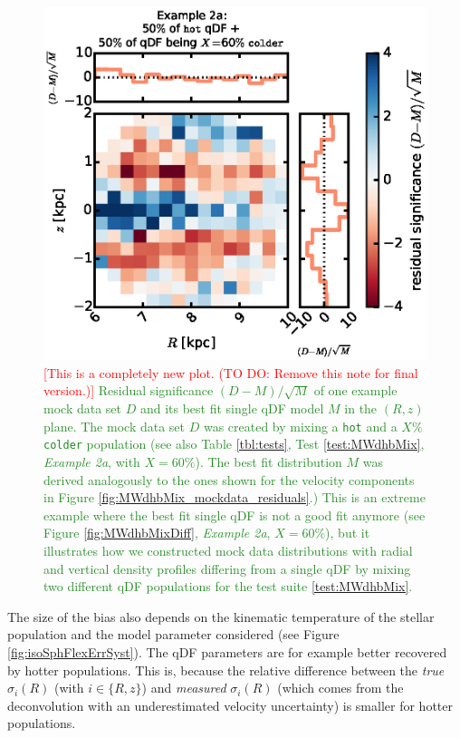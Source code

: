 \documentclass[iop,revtex4,numberedappendix,appendixfloats]{emulateapj}
\newcommand{\NEW}[1]{\textcolor{ForestGreen}{#1}}
\newcommand{\NOTE}[1]{\textcolor{Red}{#1}}
\begin{document}
\begin{figure}[!htbp]
\centering
\includegraphics[width=\columnwidth]{figs/MWbdhMixDiff_hot_2kpc_0.6_a_residual_RvsZ.eps}
\caption{\NOTE{[This is a completely new plot. (TO DO: Remove this note for final version.)]} \NEW{Residual significance $(D-M)/\sqrt{M}$ of one example mock data set $D$ and its best fit single qDF model $M$ in the $(R,z)$ plane. The mock data set $D$ was created by mixing a \texttt{hot} and a $X\%$ \texttt{colder} population (see also Table \ref{tbl:tests}, Test \ref{test:MWdhbMix}, \emph{Example 2a}, with $X=60\%$). The best fit distribution $M$ was derived analogously to the ones shown for the velocity components in Figure \ref{fig:MWdhbMix_mockdata_residuals}.) This is an extreme example where the best fit single qDF is not a good fit anymore (see Figure \ref{fig:MWdhbMixDiff}, \emph{Example 2a}, $X=60\%$), but it illustrates how we constructed mock data distributions with radial and vertical density profiles differing from a single qDF by mixing two different qDF populations for the test suite \ref{test:MWdhbMix}.}}
\label{fig:MWbdhMix_residual_RvsZ}
\end{figure}

The size of the bias also depends on the kinematic temperature of the stellar population and the model parameter considered (see Figure \ref{fig:isoSphFlexErrSyst}). The qDF parameters are for example better recovered by hotter populations. This is, because the relative difference between the \emph{true} $\sigma_i(R)$ (with $i \in \{R,z\}$) and \emph{measured} $\sigma_i(R)$ (which comes from the deconvolution with an underestimated velocity uncertainty) is smaller for hotter populations. 
\end{document}

